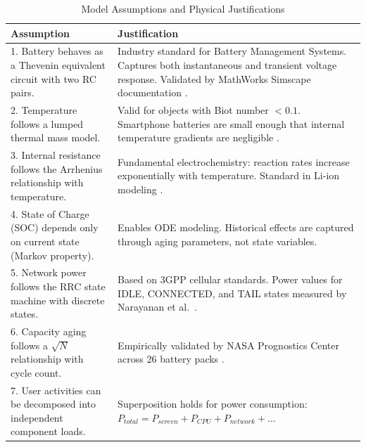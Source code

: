\documentclass[12pt]{article}
\begin{document}
\begin{table}[htbp]
\centering
\caption{Model Assumptions and Physical Justifications}
\label{tab:assumptions}
\begin{tabular}{@{}p{}p{}@{}}
\toprule
\textbf{Assumption} & \textbf{Justification} \\
\midrule

1. Battery behaves as a Thevenin equivalent circuit with two RC pairs. & 
Industry standard for Battery Management Systems. Captures both instantaneous and transient voltage response. Validated by MathWorks Simscape documentation \cite{mathworks_ecm}. \\
\addlinespace

2. Temperature follows a lumped thermal mass model. & 
Valid for objects with Biot number $< 0.1$. Smartphone batteries are small enough that internal temperature gradients are negligible \cite{drake_thermal}. \\
\addlinespace

3. Internal resistance follows the Arrhenius relationship with temperature. & 
Fundamental electrochemistry: reaction rates increase exponentially with temperature. Standard in Li-ion modeling \cite{plett_bms}. \\
\addlinespace

4. State of Charge (SOC) depends only on current state (Markov property). & 
Enables ODE modeling. Historical effects are captured through aging parameters, not state variables. \\
\addlinespace

5. Network power follows the RRC state machine with discrete states. & 
Based on 3GPP cellular standards. Power values for IDLE, CONNECTED, and TAIL states measured by Narayanan et al.\ \cite{narayanan_5g}. \\
\addlinespace

6. Capacity aging follows a $\sqrt{N}$ relationship with cycle count. & 
Empirically validated by NASA Prognostics Center across 26 battery packs \cite{nasa_battery}. \\
\addlinespace

7. User activities can be decomposed into independent component loads. & 
Superposition holds for power consumption: $P_{total} = P_{screen} + P_{CPU} + P_{network} + \ldots$ \\

\bottomrule
\end{tabular}
\end{table}
\end{document}
